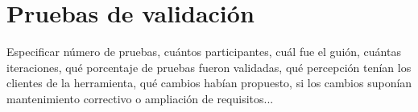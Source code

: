 \section{\forlnameref Pruebas de validación}
\label{sec:validationTests}

\begin{shaded}
Especificar número de pruebas, cuántos participantes, cuál fue el guión, cuántas iteraciones, qué porcentaje de pruebas fueron validadas, qué percepción tenían los clientes de la herramienta, qué cambios habían propuesto, si los cambios suponían mantenimiento correctivo o ampliación de requisitos...
\end{shaded}